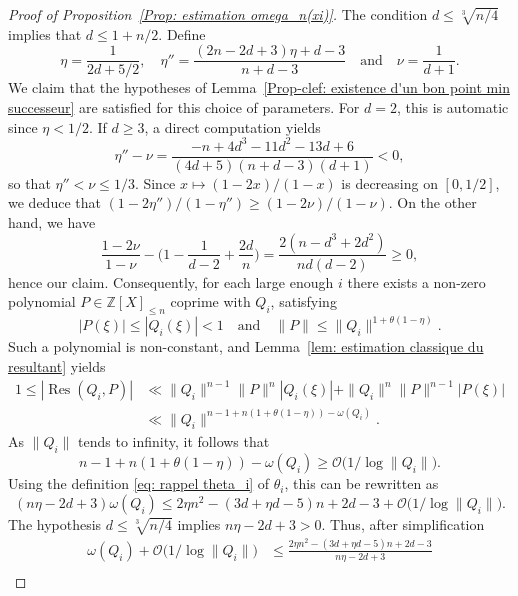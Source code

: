 \documentclass[JEP,XML,SOM,Unicode,NoFloatCountersInSection,published]{cedram}
\DeclareMathOperator\Res{Res}
\newcommand\bZ{\mathbb{Z}}
\newcommand\GrO{\mathcal{O}}
\newcommand{\normH}[1]{\|#1\|}
\newcommand\AND{\quad\text{and}\quad}
\theoremstyle{definition}
\theoremstyle{plain}
\begin{document}
\begin{proof}[Proof of Proposition~\ref{Prop: estimation omega_n(xi)}]
The condition $d\leq \sqrt[3]{n/4}$ implies that $d\leq 1+n/2$. Define
\begin{equation*}
\eta = \frac{1}{2d+5/2}, \quad \eta'' = \frac{(2n-2d+3)\eta+d-3}{n+d-3} \AND \nu = \frac{1}{d+1}.
\end{equation*}
We claim that the hypotheses of Lemma~\ref{Prop-clef: existence d'un bon point min successeur} are satisfied for this choice of parameters. For $d=2$, this is automatic since $\eta < 1/2$. If $d\geq 3$, a direct computation yields
\begin{equation*}
\eta'' - \nu = \frac{-n+4d^3-11d^2-13d+6}{(4d+5)(n+d-3)(d+1)} < 0,
\end{equation*}
so that $\eta'' < \nu \leq 1/3$. Since $x\mapsto (1-2x)/(1-x)$ is decreasing on $[0,1/2]$, we deduce that $(1-2\eta'')/(1-\eta'') \geq (1-2\nu)/(1-\nu)$. On the other hand, we have
\begin{equation*}
\frac{1-2\nu}{1-\nu} - \Big( 1-\frac{1}{d-2} + \frac{2d}{n}\Big) = \frac{2(n-d^3+2d^2)}{nd(d-2)} \geq 0,
\end{equation*}
hence our claim. Consequently, for each large enough $i$ there exists a non-zero polynomial $P\in\bZ[X]_{\leq n}$ coprime with $Q_i$, satisfying
\[
|P(\xi)| \leq |Q_i(\xi)| < 1 \AND \normH{P}\leq \normH{Q_i}^{1+\theta(1-\eta)}.
\]
Such a polynomial is non-constant, and Lemma~\ref{lem: estimation classique du resultant} yields
\begin{align*}
1 \leq |\Res(Q_i,P)| &\ll \normH{Q_i}^{n-1}\normH{P}^{n}|Q_i(\xi)| + \normH{Q_i}^{n}\normH{P}^{n-1}|P(\xi)| \\
& \ll \normH{Q_i}^{n-1+n(1+\theta(1-\eta))-\omega(Q_i)}.
\end{align*}
As $\normH{Q_i}$ tends to infinity, it follows that
\begin{equation*}
n-1+n(1+\theta(1-\eta))-\omega(Q_i) \geq \GrO\big(1/\log \normH{Q_i} \big).
\end{equation*}
Using the definition \eqref{eq: rappel theta_i} of $\theta_i$, this can be rewritten as
\begin{equation*}
(n\eta-2d+3)\omega(Q_i) \leq 2\eta n^2-(3d+\eta d-5)n+2d-3 + \GrO\big(1/\log \normH{Q_i} \big).
\end{equation*}
The hypothesis $d\leq \sqrt[3]{n/4}$ implies $n\eta-2d+3 > 0$. Thus, after simplification
\begin{align*}
\omega(Q_i) + \GrO\Big(1/\log \normH{Q_i} \Big) &\leq \frac{2\eta n^2-(3d+\eta d-5)n+2d-3}{n\eta-2d+3} \\

\end{align*}
\end{proof}
\end{document}
